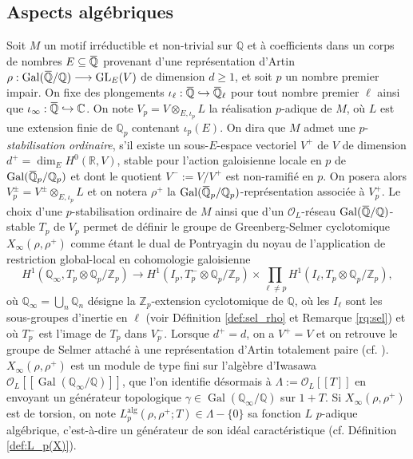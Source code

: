 \documentclass[12pt]{amsart}
\newcommand\bR{\mathbb{R}}
\newcommand\bC{\mathbb{C}}
\newcommand\bQ{\mathbb{Q}}
\newcommand\Zp{{\mathbb{Z}_{p}}}
\newcommand\Qp{\mathbb{Q}_{p}}
\newcommand\cO{\mathcal{O}}
\newcommand{\ob}[1]{\mkern 1.5mu\overline{\mkern-1.5mu#1\mkern-1.5mu}\mkern 1.5mu}
\newcommand{\alg}{\textrm{alg}}
\DeclareMathOperator{\Gal}{Gal}
\DeclareMathOperator{\GL}{GL}
\theoremstyle{defstyle}
\theoremstyle{thmstyle}
\begin{document}
\subsection*{Aspects algébriques}

Soit $M$ un motif irréductible et non-trivial sur $\bQ$ et à coefficients dans un corps de nombres $E \subseteq \ob{\bQ}$ provenant d'une représentation d'Artin $\rho : \Gal(\ob{\bQ}/\bQ) \longrightarrow \GL_E(V)$ de dimension $d\geq 1$, et soit $p$ un nombre premier impair. On fixe des plongements $\iota_\ell : \ob{\bQ} \hookrightarrow \ob{\bQ}_\ell$ pour tout nombre premier $\ell$ ainsi que $\iota_\infty : \ob{\bQ} \hookrightarrow \bC$. On note $V_p = V \otimes_{E,\iota_p} L$ la réalisation $p$-adique de $M$, où $L$ est une extension finie de $\Qp$ contenant $\iota_p(E)$. On dira que $M$ admet une $p$-\textit{stabilisation ordinaire}, s'il existe un sous-$E$-espace vectoriel $V^+$ de $V$ de dimension $d^+=\dim_E H^0(\bR,V)$, stable pour l'action galoisienne locale en $p$ de $\Gal(\ob{\bQ}_p/\bQ_p)$ et dont le quotient $V^-:=V/V^+$ est non-ramifié en $p$. On posera alors $V_p^\pm = V^\pm \otimes_{E,\iota_p} L$ et on notera $\rho^+$ la $\Gal(\ob{\bQ}_p/\Qp)$-représentation associée à $V_p^+$. Le choix d'une $p$-stabilisation ordinaire de $M$ ainsi que d'un $\cO_L$-réseau $\Gal(\ob{\bQ}/\bQ)$-stable $T_p$ de $V_p$ permet de définir le groupe de Greenberg-Selmer cyclotomique $X_\infty(\rho,\rho^+)$ comme étant le dual de Pontryagin du noyau de l'application de restriction global-local en cohomologie galoisienne
$$ H^1(\bQ_\infty,T_p \otimes \Qp/\Zp) \longrightarrow H^1(I_{p},T^-_p \otimes \Qp/\Zp) \times \prod_{\ell \neq p} H^1(I_{\ell},T_p \otimes \Qp/\Zp), $$
où $\bQ_\infty=\bigcup_n \bQ_n$ désigne la $\Zp$-extension cyclotomique de $\bQ$, où les $I_\ell$ sont les sous-groupes d'inertie en $\ell$ (voir Définition \ref{def:sel_rho} et Remarque \ref{rq:sel}) et où $T_p^-$ est l'image de $T_p$ dans $V_p^-$. Lorsque $d^+=d$, on a $V^+=V$ et on retrouve le groupe de Selmer attaché à une représentation d'Artin totalement paire (cf. \cite{greenbergartinII}). $X_\infty(\rho,\rho^+)$ est un module de type fini sur l'algèbre d'Iwasawa $\cO_L[[\Gal(\bQ_\infty/\bQ)]]$, que l'on identifie désormais à $\Lambda:=\cO_L[[T]]$ en envoyant un générateur topologique $\gamma\in\Gal(\bQ_\infty/\bQ)$ sur $1+T$. Si $X_\infty(\rho,\rho^+)$ est de torsion, on note $L_p^{\alg}(\rho,\rho^+;T) \in \Lambda-\{0\}$ sa fonction $L$ $p$-adique algébrique, c'est-à-dire un générateur de son idéal caractéristique (cf. Définition \ref{def:L_p(X)}).
\end{document}
